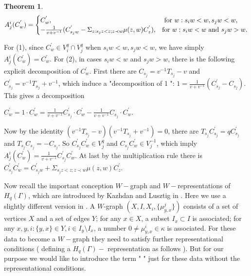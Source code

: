 \def\CTEXPreproc{Created by ctex v0.2.12, don't edit!}\documentclass[11pt]{article}
\newtheorem{thm}{Theorem}[section]
\begin{document}
    \begin{thm}
     \[
      A^i _j ( C^{'}_w   )=\begin{cases}
   C^{'}_w, &\text{ for $w: s_i w<w , s_j w<w $,    } \\
 -\frac{1}{v+v^{-1} } (C^{'} _{s_j w} - \Sigma_{z:s_j z<z; z\prec w} \mu(z,w) C^{'} _z ),
    &\text{for  $w: s_i w<w $ and $ s_j w > w$}.\\

\end{cases}
\]

    \end{thm}

   \begin{pf}
   For (1), since $ C^{'}_w \in V^{q} _i \cap V^{q} _j  $ when $s_i w<w , s_j w<w$, we have simply  $A^i _j (C^{'}_w )= C^{'}_w$. For (2), in cases $s_i w<w $ and $ s_j w >w $,  there is the following explicit decomposition of $C^{'}_w$.
   First there are $C_{s_j} = v^{-1} T_{s_j} -v  $ and $ C^{'} _{s_j } = v^{-1} T_{s_j} + v^{-1} $, which induce a "decomposition of 1 ":
   $1= \frac{1}{v+v^{-1}} ( C^{'} _{s_j} -C_{s_j}  ) $. This gives a decomposition

   $C^{'} _w = 1 \cdot C^{'} _w = \frac{1}{v+v^{-1}}C^{'} _{s_j} \cdot C^{'} _{w} -\frac{1}{v+v^{-1}} C_{s_j} \cdot C^{'} _w $.

   Now by the identity $( v^{-1} T_{s_j} -v  )( v^{-1} T_{s_j} +v^{-1}  )=0 $, there are $T_{s_j} C^{'} _{s_j} =q C^{'} _{s_j}  $
   and $T_{s_j } C_{s_j } = - C_{s_j } $.  So  $ C^{'}_{s_j} C^{'} _{w} \in V^{q} _{j} $ and
   $ C_{s_j} C^{'} _{w} \in V^{-1} _{j}  $, which imply $ A^i _j ( C^{'} _w  )=  \frac{1}{v+v^{-1}} C^{'}_{s_j} C^{'} _{w}  $. At last by the multiplication rule there is
    $ C^{'} _{s_j } C^{'} _{w} = C^{'} _{s_j w} + \Sigma_{s_j z<z; z\prec w   } \mu(z,w) C^{'} _z  $.\\
   \end{pf}




  Now recall the important conception $W-$graph and $W-$representations of $H_q (\Gamma)$, which are introduced by Kazhdan and Lusztig in \cite{KL2}. Here we use a slightly different version in \cite{GP}.   A $W$-graph $( X, I , X_i , \{ \mu^j _{y,x}  \}   )$ consists of a set of vertices  $X$ and a set of edges $Y$; for any $x\in X$, a subset  $I_x \subset I$ is associated; for any $x,y,i : \{y,x\}\in Y,   i\in I_y \setminus I_x$,  a number $0\neq \mu^{i} _{y,x}\in \kappa $ is associated. For these data to become a $W-$graph they need to satisfy further representational conditions ( defining a $H_q (\Gamma)-$ representation as follows ). But for our purpose we would like to introduce the term "   "  just for these data without the representational conditions.
\end{document}
